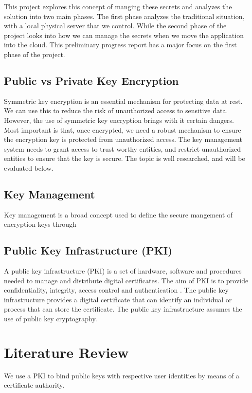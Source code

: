 \documentclass[11pt, a4paper, twoside, notitlepage]{article}
\begin{document}
This project explores this concept of manging these secrets and analyzes the solution into two main phases. The first phase analyzes the traditional situation, with a local physical server that we control. While the second phase of the project looks into how we can manage the secrets when we move the application into the cloud. This preliminary progress report has a major focus on the first phase of the project. 

\subsection*{Public vs Private Key Encryption}
Symmetric key encryption is an essential mechanism for protecting data at rest. We can use this to reduce the risk of unauthorized access to sensitive data. However, the use of symmetric key encryption brings with it certain dangers. Most important is that, once encrypted, we need a robust mechanism to ensure the encryption key is protected from unauthorized access. The key management system needs to grant access to trust worthy entities, and restrict unauthorized entities to ensure that the key is secure. The topic is well researched, and will be evaluated below. 

\subsection*{Key Management}
Key management is a broad concept used to define the secure mangement of encryption keys through

\subsection*{Public Key Infrastructure (PKI)}
A public key infrastructure (PKI) is a set of hardware, software and procedures needed to manage and distribute digital certificates. The aim of PKI is to provide confidentiality, integrity, access control and authentication \cite{PKI:Online}.    The public key infrastructure provides a digital certificate that can identify an individual or process that can store the certificate. The public key infrastructure assumes the use of public key cryptography. 

\makeblankpage

\section{Literature Review}

We use a PKI to bind public keys with respective user identities by means of a certificate authority. 
\end{document}
